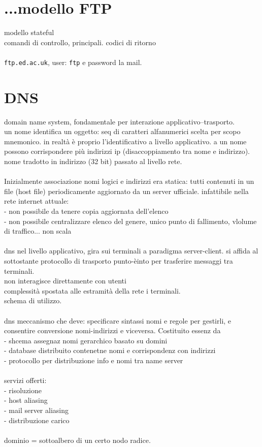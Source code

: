 \documentclass[10pt]{article}
\begin{document}
\section{...modello FTP}
modello stateful\\
comandi di controllo, principali. codici di ritorno\\\\
\texttt{ftp.ed.ac.uk}, user: \texttt{ftp} e password la mail.
\section{DNS}
domain name system, fondamentale per interazione applicativo--trasporto.\\
un nome identifica un oggetto: seq di caratteri alfanumerici scelta per scopo mnemonico. in realtà è proprio l'identificativo a livello applicativo. a un nome possono corrispondere più indirizzi ip (disaccoppiamento tra nome e indirizzo). nome tradotto in indirizzo (32 bit) passato al livello rete.\\\\
Inizialmente associazione nomi logici e indirizzi era statica: tutti contenuti in un file (host file) periodicamente aggiornato da un server ufficiale. infattibile nella rete internet attuale:\\
- non possibile da tenere copia aggiornata dell'elenco\\
- non possibile centralizzare elenco del genere, unico punto di fallimento, vlolume di traffico... non scala\\\\
dns nel livello applicativo, gira sui terminali a paradigma server-client. si affida al sottostante protocollo di trasporto punto-èinto per trasferire messaggi tra terminali.\\
non interagisce direttamente con utenti\\
complessità spostata alle estramità della rete i terminali.\\
schema di utilizzo.\\\\
dns meccanismo che deve: specificare sintassi nomi e regole per gestirli, e consentire conversione nomi-indirizzi e viceversa. Costituito essenz da\\
- shcema assegnaz nomi gerarchico basato su domini\\
- database distribuito contenetne nomi e corrispondenz con indirizzi\\
- protocollo per distribuzione info e nomi tra name server\\\\
servizi offerti:\\
- risoluzione\\
- host aliasing\\
- mail server aliasing\\
- distribuzione carico\\\\
dominio = sottoalbero di un certo nodo radice.\\
\end{document}
